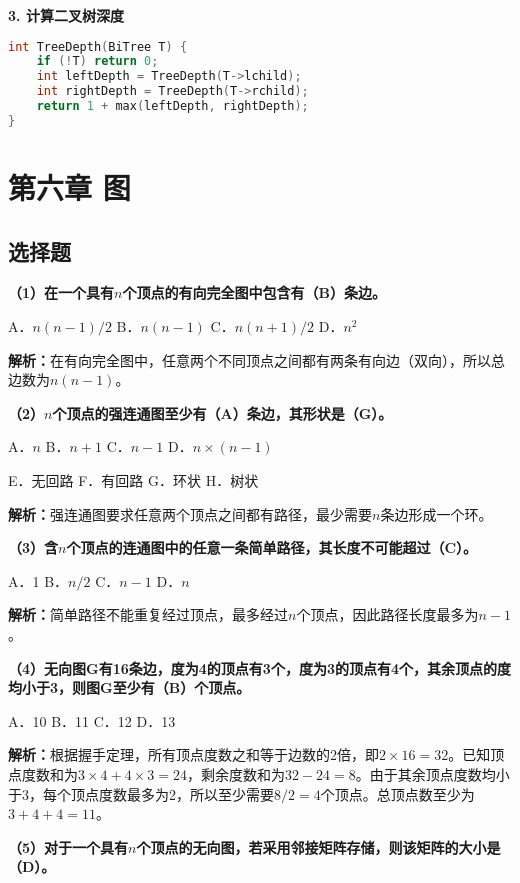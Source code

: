 \documentclass[12pt,a4paper]{amsart}
\begin{document}
\textbf{3. 计算二叉树深度}

\begin{lstlisting}[language=C++]
int TreeDepth(BiTree T) {
    if (!T) return 0;
    int leftDepth = TreeDepth(T->lchild);
    int rightDepth = TreeDepth(T->rchild);
    return 1 + max(leftDepth, rightDepth);
}
\end{lstlisting}

\section{第六章 图}

\subsection{选择题}

\textbf{（1）在一个具有$n$个顶点的有向完全图中包含有（B）条边。}

A．$n(n-1)/2$ \quad B．$n(n-1)$ \quad C．$n(n+1)/2$ \quad D．$n^2$

\textbf{解析：}在有向完全图中，任意两个不同顶点之间都有两条有向边（双向），所以总边数为$n(n-1)$。

\textbf{（2）$n$个顶点的强连通图至少有（A）条边，其形状是（G）。}

A．$n$ \quad B．$n+1$ \quad C．$n-1$ \quad D．$n \times (n-1)$

E．无回路 \quad F．有回路 \quad G．环状 \quad H．树状

\textbf{解析：}强连通图要求任意两个顶点之间都有路径，最少需要$n$条边形成一个环。

\textbf{（3）含$n$个顶点的连通图中的任意一条简单路径，其长度不可能超过（C）。}

A．1 \quad B．$n/2$ \quad C．$n-1$ \quad D．$n$

\textbf{解析：}简单路径不能重复经过顶点，最多经过$n$个顶点，因此路径长度最多为$n-1$。

\textbf{（4）无向图G有16条边，度为4的顶点有3个，度为3的顶点有4个，其余顶点的度均小于3，则图G至少有（B）个顶点。}

A．10 \quad B．11 \quad C．12 \quad D．13

\textbf{解析：}根据握手定理，所有顶点度数之和等于边数的2倍，即$2 \times 16 = 32$。已知顶点度数和为$3 \times 4 + 4 \times 3 = 24$，剩余度数和为$32 - 24 = 8$。由于其余顶点度数均小于3，每个顶点度数最多为2，所以至少需要$8/2 = 4$个顶点。总顶点数至少为$3 + 4 + 4 = 11$。

\textbf{（5）对于一个具有$n$个顶点的无向图，若采用邻接矩阵存储，则该矩阵的大小是（D）。}
\end{document}
